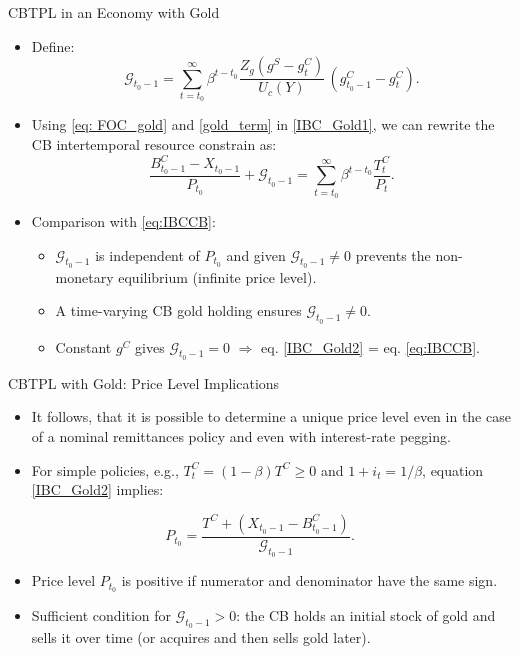 \documentclass[11pt,aspectratio=169]{beamer}
\begin{document}
\begin{frame}{CBTPL in an Economy with Gold}
\begin{itemize}
    \item Define:
    \begin{equation} \label{gold_term}
        \mathcal{G}_{t_0-1} = \sum_{t=t_0}^{\infty} \beta^{t-t_0} 
        \frac{Z_g(g^S - g_t^C)}{U_c(Y)} \,(g_{t_0-1}^C - g_t^C).
    \end{equation}

    \item Using \eqref{eq: FOC_gold} and \eqref{gold_term} in \eqref{IBC_Gold1}, we can rewrite the CB intertemporal resource constrain as:
    \begin{equation}
        \frac{B_{t_0-1}^C - X_{t_0-1}}{P_{t_0}} + \mathcal{G}_{t_0-1} =
        \sum_{t=t_0}^{\infty} \beta^{t-t_0} \frac{T_t^C}{P_t} .
        \label{IBC_Gold2}
    \end{equation}

    \item Comparison with \eqref{eq:IBCCB}:
    \begin{itemize}
        \item $\mathcal{G}_{t_0-1}$ is independent of $P_{t_0}$ and given $\mathcal{G}_{t_0-1} \neq 0$ prevents the non-monetary equilibrium (infinite price level).  
        \item A time-varying CB gold holding ensures $\mathcal{G}_{t_0-1} \neq 0$.  
        \item Constant $g^C$ gives $\mathcal{G}_{t_0-1} = 0$ $\Rightarrow$ eq. \eqref{IBC_Gold2} = eq. \eqref{eq:IBCCB}.
    \end{itemize}
\end{itemize}
\end{frame}

\begin{frame}{CBTPL with Gold: Price Level Implications}
\begin{itemize}
    \item It follows, that it is possible to determine a unique price level even in the case of a nominal remittances policy and even with interest-rate pegging.
    \vspace{0.2cm}
    \item For simple policies, e.g., $T_t^C = (1-\beta) T^C \ge 0$ and $1+i_t = 1/\beta$, equation \eqref{IBC_Gold2} implies:
\end{itemize}
\begin{equation}
P_{t_0} = \frac{T^C + (X_{t_0-1} - B_{t_0-1}^C)}{\mathcal{G}_{t_0-1}}.
\end{equation}
\begin{itemize}
    \item Price level $P_{t_0}$ is positive if numerator and denominator have the same sign.  
    \item Sufficient condition for $\mathcal{G}_{t_0-1} > 0$: the CB holds an initial stock of gold and sells it over time (or acquires and then sells gold later).  
\end{itemize}
\end{frame}
\end{document}
